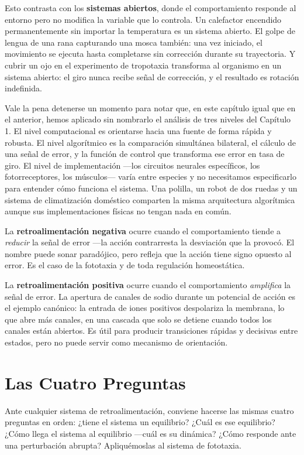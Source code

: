 \documentclass[
  letterpaper,
  DIV=11,
  numbers=noendperiod]{scrreprt}
\begin{document}
Esto contrasta con los \textbf{sistemas abiertos}, donde el
comportamiento responde al entorno pero no modifica la variable que lo
controla. Un calefactor encendido permanentemente sin importar la
temperatura es un sistema abierto. El golpe de lengua de una rana
capturando una mosca también: una vez iniciado, el movimiento se ejecuta
hasta completarse sin corrección durante su trayectoria. Y cubrir un ojo
en el experimento de tropotaxia transforma al organismo en un sistema
abierto: el giro nunca recibe señal de corrección, y el resultado es
rotación indefinida.

Vale la pena detenerse un momento para notar que, en este capítulo igual
que en el anterior, hemos aplicado sin nombrarlo el análisis de tres
niveles del Capítulo 1. El nivel computacional es orientarse hacia una
fuente de forma rápida y robusta. El nivel algorítmico es la comparación
simultánea bilateral, el cálculo de una señal de error, y la función de
control que transforma ese error en tasa de giro. El nivel de
implementación ---los circuitos neurales específicos, los
fotorreceptores, los músculos--- varía entre especies y no necesitamos
especificarlo para entender cómo funciona el sistema. Una polilla, un
robot de dos ruedas y un sistema de climatización doméstico comparten la
misma arquitectura algorítmica aunque sus implementaciones físicas no
tengan nada en común.

La \textbf{retroalimentación negativa} ocurre cuando el comportamiento
tiende a \emph{reducir} la señal de error ---la acción contrarresta la
desviación que la provocó. El nombre puede sonar paradójico, pero
refleja que la acción tiene signo opuesto al error. Es el caso de la
fototaxia y de toda regulación homeostática.

La \textbf{retroalimentación positiva} ocurre cuando el comportamiento
\emph{amplifica} la señal de error. La apertura de canales de sodio
durante un potencial de acción es el ejemplo canónico: la entrada de
iones positivos despolariza la membrana, lo que abre más canales, en una
cascada que solo se detiene cuando todos los canales están abiertos. Es
útil para producir transiciones rápidas y decisivas entre estados, pero
no puede servir como mecanismo de orientación.

\section{Las Cuatro Preguntas}\label{las-cuatro-preguntas}

Ante cualquier sistema de retroalimentación, conviene hacerse las mismas
cuatro preguntas en orden: ¿tiene el sistema un equilibrio? ¿Cuál es ese
equilibrio? ¿Cómo llega el sistema al equilibrio ---cuál es su dinámica?
¿Cómo responde ante una perturbación abrupta? Apliquémoslas al sistema
de fototaxia.
\end{document}
